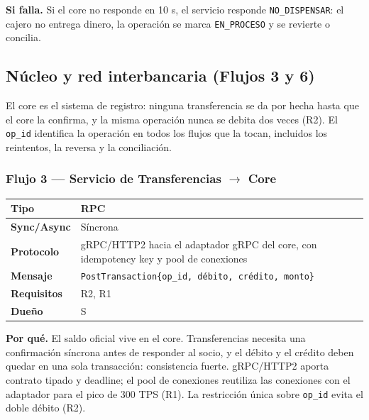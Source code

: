 \documentclass[11pt,a4paper]{article}
\begin{document}
\textbf{Si falla.} Si el core no responde en 10 s, el servicio responde \texttt{NO\_DISPENSAR}:
el cajero no entrega dinero, la operación se marca \texttt{EN\_PROCESO} y se revierte o concilia.

\subsection{Núcleo y red interbancaria (Flujos 3 y 6)}

El core es el sistema de registro: ninguna transferencia se da por hecha hasta que el core la
confirma, y la misma operación nunca se debita dos veces (R2). El \texttt{op\_id} identifica la
operación en todos los flujos que la tocan, incluidos los reintentos, la reversa y la
conciliación.

\subsubsection*{Flujo 3 --- Servicio de Transferencias $\rightarrow$ Core}

\begin{tabular}{|l|p{9.5cm}|}
\hline
\textbf{Tipo} & RPC \\ \hline
\textbf{Sync/Async} & Síncrona \\ \hline
\textbf{Protocolo} & gRPC/HTTP2 hacia el adaptador gRPC del core, con idempotency key y pool de conexiones \\ \hline
\textbf{Mensaje} & \texttt{PostTransaction\{op\_id, débito, crédito, monto\}} \\ \hline
\textbf{Requisitos} & R2, R1 \\ \hline
\textbf{Dueño} & S \\ \hline
\end{tabular}

\medskip
\textbf{Por qué.} El saldo oficial vive en el core. Transferencias necesita una confirmación
síncrona antes de responder al socio, y el débito y el crédito deben quedar en una sola
transacción: consistencia fuerte. gRPC/HTTP2 aporta contrato tipado y deadline; el pool de
conexiones reutiliza las conexiones con el adaptador para el pico de 300 TPS (R1). La restricción
única sobre \texttt{op\_id} evita el doble débito (R2).
\end{document}
